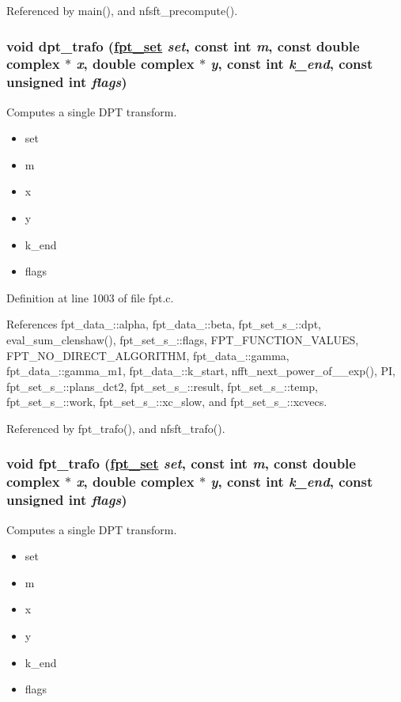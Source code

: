Referenced by main(), and nfsft\_\-precompute().\hypertarget{group__fpt_ga3}{
\subsubsection[dpt\_\-trafo]{\setlength{\rightskip}{0pt plus 5cm}void dpt\_\-trafo (\hyperlink{structfpt__set__s__}{fpt\_\-set} {\em set}, const int {\em m}, const double complex $\ast$ {\em x}, double complex $\ast$ {\em y}, const int {\em k\_\-end}, const unsigned int {\em flags})}}
\label{group__fpt_ga3}


Computes a single DPT transform. 

\begin{itemize}
\item set \item m \item x \item y \item k\_\-end \item flags \end{itemize}


Definition at line 1003 of file fpt.c.

References fpt\_\-data\_\-::alpha, fpt\_\-data\_\-::beta, fpt\_\-set\_\-s\_\-::dpt, eval\_\-sum\_\-clenshaw(), fpt\_\-set\_\-s\_\-::flags, FPT\_\-FUNCTION\_\-VALUES, FPT\_\-NO\_\-DIRECT\_\-ALGORITHM, fpt\_\-data\_\-::gamma, fpt\_\-data\_\-::gamma\_\-m1, fpt\_\-data\_\-::k\_\-start, nfft\_\-next\_\-power\_\-of\_\_\-exp(), PI, fpt\_\-set\_\-s\_\-::plans\_\-dct2, fpt\_\-set\_\-s\_\-::result, fpt\_\-set\_\-s\_\-::temp, fpt\_\-set\_\-s\_\-::work, fpt\_\-set\_\-s\_\-::xc\_\-slow, and fpt\_\-set\_\-s\_\-::xcvecs.

Referenced by fpt\_\-trafo(), and nfsft\_\-trafo().\hypertarget{group__fpt_ga4}{
\subsubsection[fpt\_\-trafo]{\setlength{\rightskip}{0pt plus 5cm}void fpt\_\-trafo (\hyperlink{structfpt__set__s__}{fpt\_\-set} {\em set}, const int {\em m}, const double complex $\ast$ {\em x}, double complex $\ast$ {\em y}, const int {\em k\_\-end}, const unsigned int {\em flags})}}
\label{group__fpt_ga4}


Computes a single DPT transform. 

\begin{itemize}
\item set \item m \item x \item y \item k\_\-end \item flags \end{itemize}


